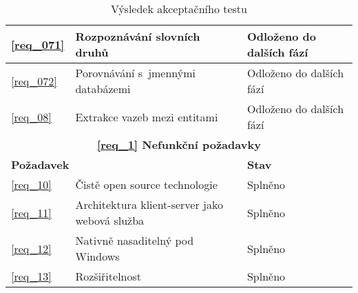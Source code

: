 \begin{table}
\begin{center}
\begin{tabular}{|l|l|l|}
\ref{req_071} & Rozpoznávání slovních druhů & Odloženo do dalších fází\\ \hline 
\ref{req_072} & Porovnávání s~jmennými databázemi & Odloženo do dalších fází\\ \hline 
\ref{req_08} & Extrakce vazeb mezi entitami & Odloženo do dalších fází\\ \hline 
\hline
\multicolumn{3}{|c|}{\textbf{\ref{req_1} Nefunkční požadavky}} \\ \hline
\multicolumn{2}{|l|}{\textbf{Požadavek}} & \textbf{Stav} \\ \hline
\ref{req_10} & Čistě open source technologie & Splněno\\ \hline 
\ref{req_11} & Architektura klient-server jako webová služba & Splněno\\ \hline
\ref{req_12} & Nativně nasaditelný pod Windows & Splněno\\ \hline
\ref{req_13} & Rozšiřitelnost & Splněno\\ \hline
\end{tabular}
\end{center}
\caption{Výsledek akceptačního testu}
\label{tab:test_accept}
\end{table}
